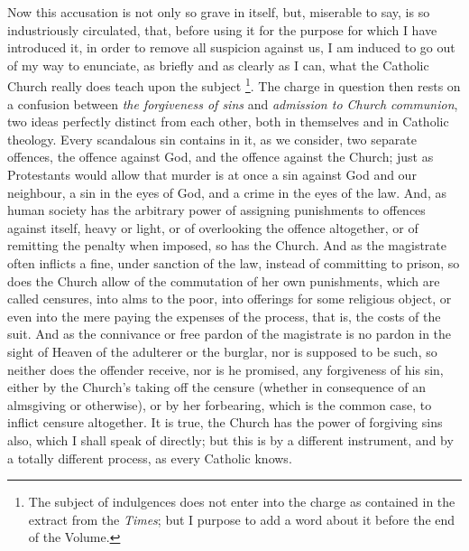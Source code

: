 Now this accusation is not only so grave in itself,
but, miserable to say, is so industriously circulated,
that, before using it for the purpose for which I have
introduced it, in order to remove all suspicion against
us, I am induced to go out of my way to enunciate, as
briefly and as clearly as I can, what the Catholic Church
really does teach upon the subject \footnote{The subject of indulgences does
not enter into the charge as contained in the extract
from the \emph{Times}; but I purpose to add a word
about it before the end of the Volume.}. The charge in question then
rests on a confusion between \emph{the forgiveness of sins}
and \emph{admission to Church communion}, two ideas
perfectly distinct from each other, both in themselves
and in Catholic theology. Every scandalous sin contains
in it, as we consider, two separate offences, the offence
against God, and the offence against the Church; just as
Protestants would allow that murder is at once a sin
against God and our neighbour, a sin in the eyes of God,
and a crime in the eyes of the law. And, as human society
has the arbitrary power of assigning punishments to
offences against itself, heavy or light, or of
overlooking the offence altogether, or of remitting the
penalty when imposed, so has the Church. And as the
magistrate often inflicts a fine, under sanction of the
law, instead of committing to prison, so does the Church
allow of the commutation of her own punishments, which
are called censures, into alms to the poor, into
offerings for some religious object, or even into the
mere paying the expenses of the process, that is, the
costs of the suit. And as the connivance or free pardon
of the magistrate is no pardon in the sight of Heaven of
the adulterer or the burglar, nor is supposed to be such,
so neither does the offender receive, nor is he promised,
any forgiveness of his sin, either by the Church's taking
off the censure (whether in consequence of an almsgiving
or otherwise), or by her forbearing, which is the common
case, to inflict censure altogether. It is true, the
Church has the power of forgiving sins also, which I
shall speak of directly; but this is by a different
instrument, and by a totally different process, as every
Catholic knows.

